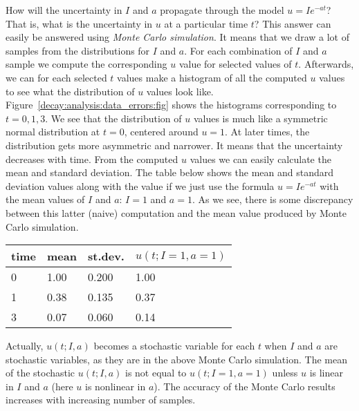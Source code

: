 \documentclass[graybox,sectrefs,envcountresetchap,open=right,final]{svmonodo}
\begin{document}
How will the uncertainty in $I$ and $a$ propagate through the model
$u=Ie^{-at}$? That is, what is the uncertainty in $u$ at a particular
time $t$? This answer can easily be answered using \emph{Monte Carlo
simulation}. It means that we draw a lot of samples from the
distributions for $I$ and $a$. For each combination of $I$ and $a$
sample we compute the corresponding $u$ value for selected values of
$t$.  Afterwards, we can for each selected $t$ values make a histogram
of all the computed $u$ values to see what the distribution of $u$
values look like. Figure~\ref{decay:analysis:data_errors:fig} shows the
histograms corresponding to $t=0,1,3$. We see that the distribution of
$u$ values is much like a symmetric normal distribution at $t=0$,
centered around $u=1$. At later times, the distribution gets more
asymmetric and narrower. It means that the uncertainty decreases with
time. From the computed $u$ values we can easily calculate the mean
and standard deviation. The table below shows the mean and standard
deviation values along with the value if we just use the formula
$u=Ie^{-at}$ with the mean values of $I$ and $a$: $I=1$ and $a=1$. As
we see, there is some discrepancy between this latter (naive)
computation and the mean value produced by Monte Carlo simulation.



{\small   %

\vspace{4mm}

\begin{tabular}{llll}
\hline
\multicolumn{1}{c}{ time } & \multicolumn{1}{c}{ mean } & \multicolumn{1}{c}{ st.dev. } & \multicolumn{1}{c}{ $u(t;I=1,a=1)$ } \\
\hline
0    & 1.00 & 0.200   & 1.00           \\
1    & 0.38 & 0.135   & 0.37           \\
3    & 0.07 & 0.060   & 0.14           \\
\hline
\end{tabular}

\vspace{4mm}

}


\noindent
Actually, $u(t;I,a)$ becomes a stochastic variable for each $t$ when
$I$ and $a$ are stochastic variables, as they are in the above
Monte Carlo simulation. The mean of the stochastic $u(t;I,a)$ is
not equal to $u(t;I=1,a=1)$ unless $u$ is linear in $I$ and $a$
(here $u$ is nonlinear in $a$). The accuracy of the Monte Carlo
results increases with increasing number of samples.
\end{document}
